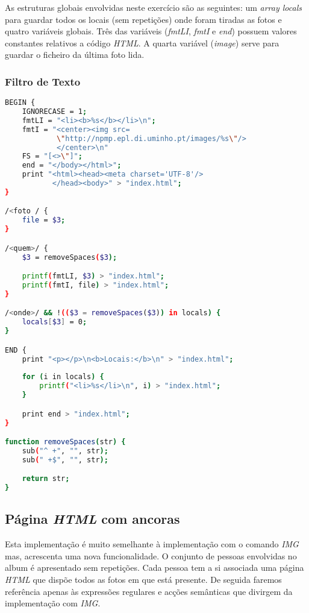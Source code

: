 \documentclass{article}
\begin{document}
As estruturas globais envolvidas neste exercício são as seguintes: um \emph{array locals} para guardar todos os locais (sem repetições) onde foram tiradas as fotos e quatro variáveis globais. Três das variáveis (\emph{fmtLI}, \emph{fmtI} e \emph{end}) possuem valores constantes relativos a código \emph{HTML}. A quarta variável (\emph{image}) serve para guardar o ficheiro da última foto lida.


\subsubsection{Filtro de Texto}

\begin{lstlisting}[language=bash]
BEGIN {
	IGNORECASE = 1;
	fmtLI = "<li><b>%s</b></li>\n";
	fmtI = "<center><img src=
	        \"http://npmp.epl.di.uminho.pt/images/%s\"/> 
	        </center>\n"
	FS = "[<>\"]";
	end = "</body></html>";
	print "<html><head><meta charset='UTF-8'/>
	       </head><body>" > "index.html";
}

/<foto / {
	file = $3;
}

/<quem>/ {
	$3 = removeSpaces($3);

	printf(fmtLI, $3) > "index.html";
	printf(fmtI, file) > "index.html";
}

/<onde>/ && !(($3 = removeSpaces($3)) in locals) {
	locals[$3] = 0;
}

END {
	print "<p></p>\n<b>Locais:</b>\n" > "index.html";
	
	for (i in locals) {
		printf("<li>%s</li>\n", i) > "index.html";
	}

	print end > "index.html";
}

function removeSpaces(str) {
	sub("^ +", "", str);
	sub(" +$", "", str);

	return str;
}

\end{lstlisting}



\subsection{Página \emph{HTML} com ancoras}
Esta implementação é muito semelhante à implementação com o comando \emph{IMG} mas, acrescenta uma nova funcionalidade. O conjunto de pessoas envolvidas no album é apresentado sem repetições. Cada pessoa tem a si associada uma página \emph{HTML} que dispõe todos as fotos em que está presente. De seguida faremos referência apenas às expressões regulares e acções semânticas que divirgem da implementação com \emph{IMG}.
\end{document}
